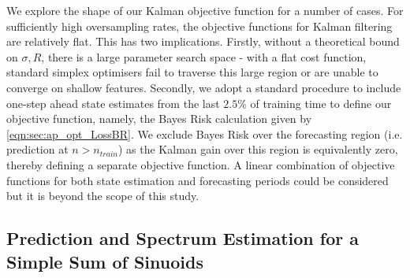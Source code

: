 We explore the shape of our Kalman objective function for a number of cases. For sufficiently high oversampling rates, the objective functions for Kalman filtering are relatively flat. This has two implications. Firstly, without a theoretical bound on $\sigma, R$, there is a large parameter search space - with a flat cost function, standard simplex optimisers fail to traverse this large region or are unable to converge on shallow features. Secondly, we adopt a standard procedure to include one-step ahead state estimates from the last $2.5\%$ of training time to define our objective function, namely, the Bayes Risk calculation given by \eqref{eqn:sec:ap_opt_LossBR}. We exclude Bayes Risk over the forecasting region (i.e. prediction at $n>n_{train}$) as the Kalman gain over this region is equivalently zero, thereby defining a separate objective function. A linear combination of objective functions for both state estimation and forecasting periods could be considered but it is beyond the scope of this study. 

\subsection{Prediction and Spectrum Estimation for a Simple Sum of Sinuoids}
 
